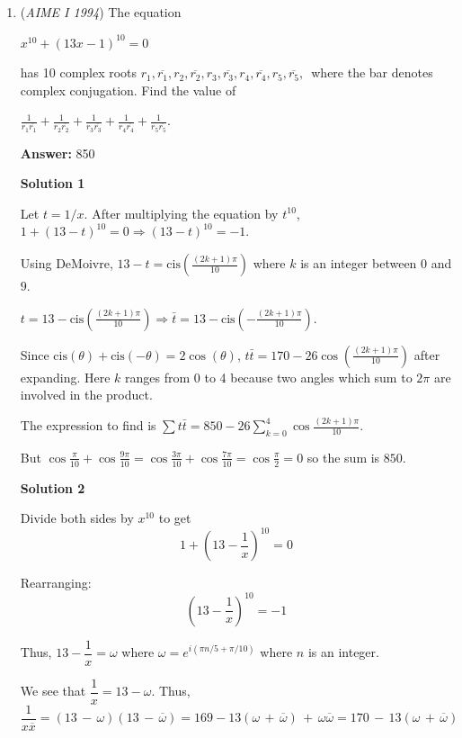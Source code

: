 \begin{enumerate}
	\item (\textit{AIME I 1994}) The equation


 $x^{10}+(13x-1)^{10}=0\,$

 has 10 complex roots $r_1, \overline{r_1}, r_2, \overline{r_2}, r_3, \overline{r_3}, r_4, \overline{r_4}, r_5, \overline{r_5},\,$ where the bar denotes complex conjugation.  Find the value of


 $\frac 1{r_1\overline{r_1}}+\frac 1{r_2\overline{r_2}}+\frac 1{r_3\overline{r_3}}+\frac 1{r_4\overline{r_4}}+\frac 1{r_5\overline{r_5}}.$

 \textbf{Answer: }850



\textbf{Solution 1}

Let $t = 1/x$. After multiplying the equation by $t^{10}$, $1 + (13 - t)^{10} = 0\Rightarrow (13 - t)^{10} = - 1$.

 Using DeMoivre, $13 - t = \text{cis}\left(\frac {(2k + 1)\pi}{10}\right)$ where $k$ is an integer between $0$ and $9$.

 $t = 13 - \text{cis}\left(\frac {(2k + 1)\pi}{10}\right) \Rightarrow \bar{t} = 13 - \text{cis}\left(-\frac {(2k + 1)\pi}{10}\right)$.

 Since $\text{cis}(\theta) + \text{cis}(-\theta) = 2\cos(\theta)$, $t\bar{t} = 170 - 26\cos \left(\frac {(2k + 1)\pi}{10}\right)$ after expanding. Here $k$ ranges from 0 to 4 because two angles which sum to $2\pi$ are involved in the product.

 The expression to find is $\sum t\bar{t} = 850 - 26\sum_{k = 0}^4 \cos \frac {(2k + 1)\pi}{10}$.

 But $\cos \frac {\pi}{10} + \cos \frac {9\pi}{10} = \cos \frac {3\pi}{10} + \cos \frac {7\pi}{10} = \cos \frac {\pi}{2} = 0$ so the sum is $\boxed{850}$.

 



\textbf{Solution 2}

Divide both sides by $x^{10}$ to get 
 \[1 + \left(13-\dfrac{1}{x}\right)^{10}=0\]

 Rearranging: 
 \[\left(13-\dfrac{1}{x}\right)^{10} = -1\]

 Thus, $13-\dfrac{1}{x} = \omega$ where $\omega = e^{i(\pi n/5+\pi/10)}$ where $n$ is an integer.

 We see that $\dfrac{1}{x}=13-\omega$. Thus, 
 \[\dfrac{1}{x\overline{x}}=(13\, -\, \omega)(13\, -\, \overline{\omega})=169-13(\omega\, +\, \overline{\omega})\, +\, \omega\overline{\omega}=170\, -\, 13(\omega\, +\, \overline{\omega})\]


\end{enumerate}
